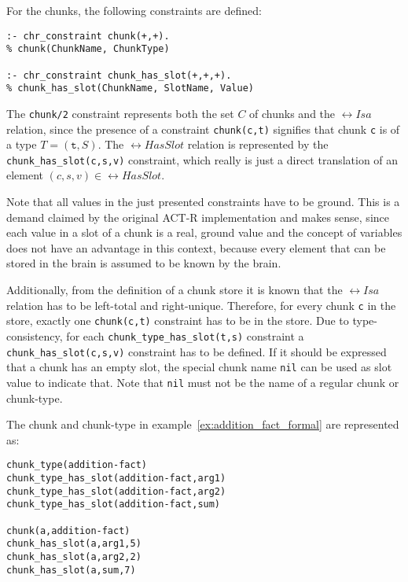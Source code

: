 For the chunks, the following constraints are defined:

\begin{lstlisting}
:- chr_constraint chunk(+,+).
% chunk(ChunkName, ChunkType)

:- chr_constraint chunk_has_slot(+,+,+).
% chunk_has_slot(ChunkName, SlotName, Value)
\end{lstlisting}

The \lstinline|chunk/2| constraint represents both the set $C$ of chunks and the $\rel{Isa}$ relation, since the presence of a constraint \lstinline|chunk(c,t)| signifies that chunk \lstinline|c| is of a type $T = (\mathtt{t},S)$. The $\rel{HasSlot}$ relation is represented by the \lstinline|chunk_has_slot(c,s,v)| constraint, which really is just a direct translation of an element $(c,s,v) \in \rel{HasSlot}$.

Note that all values in the just presented constraints have to be ground. This is a demand claimed by the original ACT-R implementation and makes sense, since each value in a slot of a chunk is a real, ground value and the concept of variables does not have an advantage in this context, because every element that can be stored in the brain is assumed to be known by the brain.

Additionally, from the definition of a chunk store it is known that the $\rel{Isa}$ relation has to be left-total and right-unique. Therefore, for every chunk \lstinline|c| in the store, exactly one \lstinline|chunk(c,t)| constraint has to be in the store. Due to type-consistency, for each \lstinline|chunk_type_has_slot(t,s)| constraint a \lstinline|chunk_has_slot(c,s,v)| constraint has to be defined. If it should be expressed that a chunk has an empty slot, the special chunk name \lstinline|nil| can be used as slot value to indicate that. Note that \lstinline|nil| must not be the name of a regular chunk or chunk-type.

\begin{example}
\label{ex:addition_fact_chr}
The chunk and chunk-type in example~\ref{ex:addition_fact_formal} are represented as:

\begin{lstlisting}
chunk_type(addition-fact)
chunk_type_has_slot(addition-fact,arg1)
chunk_type_has_slot(addition-fact,arg2)
chunk_type_has_slot(addition-fact,sum)

chunk(a,addition-fact)
chunk_has_slot(a,arg1,5)
chunk_has_slot(a,arg2,2)
chunk_has_slot(a,sum,7)
\end{lstlisting}
\end{example}


